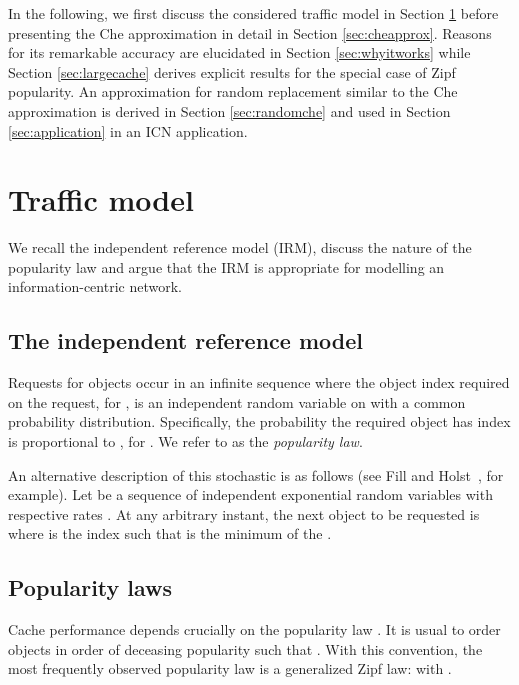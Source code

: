 \documentclass{amsart}
\begin{document}
\vspace{2mm}
In the following, we first discuss the considered traffic model in Section \ref{sec:trafficmodel}  before presenting the Che approximation in detail in Section \ref{sec:cheapprox}. Reasons for its remarkable accuracy are elucidated in Section \ref{sec:whyitworks} while Section \ref{sec:largecache} derives explicit results for the special case of Zipf popularity. An approximation for random replacement similar to the Che approximation is derived in Section \ref{sec:randomche} and used in Section \ref{sec:application} in an ICN application.





 
 \section{Traffic model}
 \label{sec:trafficmodel}
 
We recall the independent reference model (IRM), discuss the nature of the popularity law  and argue that the IRM is appropriate for modelling an information-centric network.

\subsection{The independent reference model}
 
Requests for objects occur in an infinite sequence where the object index required on the  request,  for , is an independent random variable on  with a common probability distribution. Specifically, the probability the required object has index  is proportional to , for . We refer to  as the \emph{popularity law}. 

An alternative description of this stochastic is as follows (see Fill and Holst~\cite{FillHolst}, for example). Let  be a sequence of independent exponential random variables with respective rates . At any arbitrary instant, the next object to be requested is  where  is the index such that  is the minimum of the . 

\subsection{Popularity laws}
Cache performance depends crucially on the popularity law . It is usual to order objects in order of deceasing popularity such that . With this convention, the most frequently observed popularity law is a generalized Zipf law:  with . 
\end{document}
